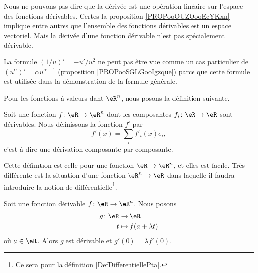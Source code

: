 \begin{remark}
    Nous ne pouvons pas dire que la dérivée est une opération linéaire sur l'espace des fonctions dérivables. Certes la proposition \ref{PROPooOUZOooEcYKxn} implique entre autres que l'ensemble des fonctions dérivables est un espace vectoriel. Mais la dérivée d'une fonction dérivable n'est pas spécialement dérivable.
\end{remark}

\begin{remark}
    La formule \( (1/u)'=-u'/u^2\) ne peut pas être vue comme un cas particulier de \( (u^{\alpha})'=\alpha u^{\alpha-1}\) (proposition \ref{PROPooSGLGooIgzque}) parce que cette formule est utilisée dans la démonstration de la formule générale.
\end{remark}


Pour les fonctions à valeurs dant \( \eR^n\), nous posons la définition suivante.
\begin{definition}
    Soit une fonction \( f\colon \eR\to \eR^n\) dont les composantes \( f_i\colon \eR\to \eR\) sont dérivables. Nous définissons la fonction \( f'\) par
    \begin{equation}
        f'(x)=\sum_if'_i(x)e_i,
    \end{equation}
    c'est-à-dire une dérivation composante par composante.
\end{definition}

Cette définition est celle pour une fonction \( \eR\to \eR^n\), et elles est facile. Très différente est la situation d'une fonction \( \eR^n\to \eR\) dans laquelle il faudra introduire la notion de différentielle\footnote{Ce sera pour la définition \ref{DefDifferentiellePta}.}.

\begin{lemma}       \label{LEMooXHVBooHYjXdq}
    Soit une fonction dérivable \( f\colon \eR\to \eR^n\). Nous posons
    \begin{equation}
        \begin{aligned}
            g\colon \eR&\to \eR \\
            t&\mapsto f(a+\lambda t) 
        \end{aligned}
    \end{equation}
    où \( a\in \eR\). Alors \( g\) est dérivable et \( g'(0)=\lambda  f'(0)\).
\end{lemma}

